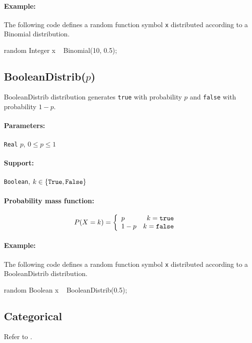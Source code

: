 \paragraph*{Example:}
The following code defines a random function symbol \verb|x| distributed according to a Binomial distribution.
\begin{blogcode}
random Integer x ~ Binomial(10, 0.5);
\end{blogcode}

\subsection{BooleanDistrib($p$)} \label{boolean-distribution-section}
BooleanDistrib distribution generates \verb|true| with probability $p$ and \verb|false| with probability $1-p$. 

\paragraph*{Parameters:} 
\begin{itemize*}
\item[] \verb|Real|
 $p$, $0 \leq p \leq 1$ 
\end{itemize*}
\paragraph*{Support:} \verb|Boolean|, $k \in \{\verb|True|, \verb|False|\}$ 

\paragraph*{Probability mass function:}
\[
	P(X = k) = \left\{
	  \begin{array}{lr}
	    p & k = \verb|true| \\
	    1 - p & k = \verb|false|
	  \end{array}
	\right.
\]

\paragraph*{Example:}
The following code defines a random function symbol \verb|x| distributed according to a BooleanDistrib distribution.
\begin{blogcode}
random Boolean x ~ BooleanDistrib(0.5);
\end{blogcode}

\subsection{Categorical}
Refer to .


